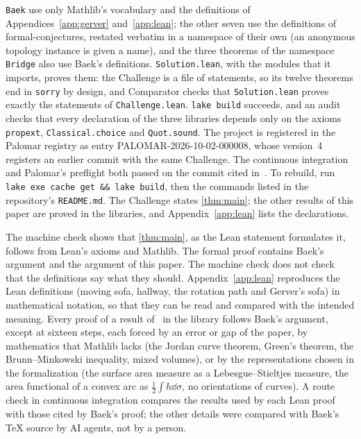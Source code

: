 \texttt{Baek} use only Mathlib's vocabulary and the definitions of
Appendices~\ref{app:gerver} and~\ref{app:lean}; the other seven use the
definitions of formal-conjectures, restated verbatim in a namespace of their own
(an anonymous topology instance is given a name), and the three theorems of the
namespace \texttt{Bridge} also use Baek's definitions. \texttt{Solution.lean},
with the modules that it imports, proves them: the Challenge is a file of
statements, so its twelve theorems end in \texttt{sorry} by design, and
Comparator checks that \texttt{Solution.lean} proves exactly the statements of
\texttt{Challenge.lean}. \texttt{lake build} succeeds, and an audit checks that
every declaration of the three libraries depends only on the axioms
\texttt{propext}, \texttt{Classical.choice} and \texttt{Quot.sound}. The project
is registered in the Palomar registry as entry PALOMAR-2026-10-02-000008, whose
version~4 registers an earlier commit with the same Challenge. The continuous
integration and Palomar's preflight both passed on the commit cited
in~\cite{Companion}. To rebuild, run \texttt{lake exe cache get \&\& lake
build}, then the commands listed in the repository's \texttt{README.md}. The
Challenge states \cref{thm:main}; the other results of this paper are proved in
the libraries, and Appendix~\ref{app:lean} lists the declarations.

The machine check shows that \cref{thm:main}, as the Lean statement formulates
it, follows from Lean's axioms and Mathlib. The formal proof contains Baek's
argument and the argument of this paper. The machine check does not check that
the definitions say what they should. Appendix~\ref{app:lean} reproduces the
Lean definitions (moving sofa, hallway, the rotation path and Gerver's sofa) in
mathematical notation, so that they can be read and compared with the intended
meaning. Every proof of a result of~\cite{Baek} in the library follows Baek's
argument, except at sixteen steps, each forced by an error or gap of the paper,
by mathematics that Mathlib lacks (the Jordan curve theorem, Green's theorem,
the Brunn--Minkowski inequality, mixed volumes), or by the representations
chosen in the formalization (the surface area measure as a Lebesgue--Stieltjes
measure, the area functional of a convex arc as $\frac12\int h\dd\sigma$, no
orientations of curves). A route check in continuous integration compares the
results used by each Lean proof with those cited by Baek's proof; the other
details were compared with Baek's TeX source by AI agents, not by a person.

